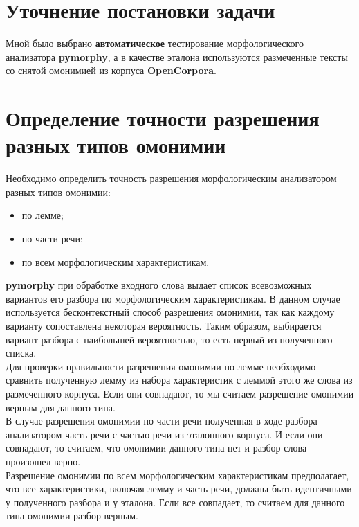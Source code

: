 \documentclass[oneside,final,12pt]{article}
\begin{document}
\section{Уточнение постановки задачи}

Мной было выбрано  \textbf{автоматическое} тестирование морфологического анализатора \textbf{pymorphy}, а в качестве эталона используются размеченные тексты со снятой омонимией из корпуса \textbf{OpenCorpora}.

\section{Определение точности разрешения разных типов омонимии}

Необходимо определить точность разрешения морфологическим анализатором разных типов омонимии:

\begin{itemize}
	\item по лемме;
	\item по части речи;
	\item по всем морфологическим характеристикам.
\end{itemize}

\textbf{pymorphy} при обработке входного слова выдает список всевозможных вариантов его разбора по морфологическим характеристикам. В данном случае используется бесконтекстный способ разрешения омонимии, так как каждому варианту сопоставлена некоторая вероятность. Таким образом, выбирается вариант разбора с наибольшей вероятностью, то есть первый из полученного списка.\\

Для проверки правильности разрешения омонимии по лемме необходимо сравнить полученную лемму из набора характеристик с леммой этого же слова из размеченного корпуса. Если они совпадают, то мы считаем разрешение омонимии верным для данного типа.\\

В случае разрешения омонимии по части речи полученная в ходе разбора анализатором часть речи с частью речи из эталонного корпуса. И если они совпадают, то считаем, что омонимии данного типа нет и разбор слова произошел верно.\\

Разрешение омонимии по всем морфологическим характеристикам предполагает, что все характеристики, включая лемму и часть речи, должны быть идентичными у полученного разбора и у эталона. Если все совпадает, то считаем для данного типа омонимии разбор верным.\\
\end{document}
